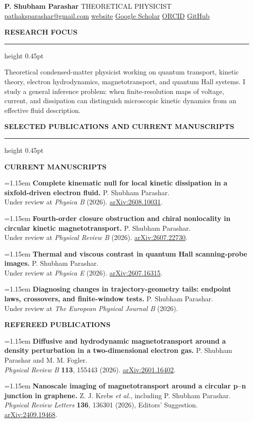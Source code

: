\documentclass[10.5pt,a4paper]{article}
\newcommand{\sans}[1]{{\sffamily #1}}
\newcommand{\cvsection}[1]{%
  \vspace{11.5pt}%
  {\sans{\fontsize{9.1}{10}\selectfont\bfseries\color{accent}\MakeUppercase{#1}}}\par
  \vspace{2.4pt}\color{rule}\hrule height 0.45pt\color{ink}\vspace{5.4pt}
}
\newcommand{\pub}[3]{%
  \noindent\hangindent=1.15em\hangafter=1
  {\bfseries #1} #2\\[-0.8pt]
  {\sans{\fontsize{9.3}{11}\selectfont\color{muted}#3}}\par\vspace{6.2pt}
}
\newcommand{\pubgroup}[1]{%
  \vspace{1.0pt}%
  {\sans{\fontsize{8.5}{9.6}\selectfont\bfseries\color{muted}\MakeUppercase{#1}}}\par
  \vspace{4.6pt}
}
\begin{document}
\raggedbottom

{\fontsize{26}{28}\selectfont\bfseries P. Shubham Parashar}\hfill
{\sans{\fontsize{9.6}{11}\selectfont\color{muted}THEORETICAL PHYSICIST}}\\[2.0pt]
{\sans{\fontsize{9.6}{11.5}\selectfont
\href{mailto:pathaksparashar@gmail.com}{pathaksparashar@gmail.com} \enspace\textperiodcentered\enspace
\href{https://shubham-parashar-cmt.github.io/}{website} \enspace\textperiodcentered\enspace
\href{https://scholar.google.com/citations?user=XXOQp8wAAAAJ\&hl=en}{Google Scholar} \enspace\textperiodcentered\enspace
\href{https://orcid.org/0009-0007-8741-9101}{ORCID} \enspace\textperiodcentered\enspace
\href{https://github.com/shubham-parashar-cmt}{GitHub}}}

\cvsection{Research focus}
\fontsize{10.6}{13.3}\selectfont
Theoretical condensed-matter physicist working on quantum transport, kinetic theory, electron hydrodynamics, magnetotransport, and quantum Hall systems. I study a general inference problem: when finite-resolution maps of voltage, current, and dissipation can distinguish microscopic kinetic dynamics from an effective fluid description.

\cvsection{Selected publications and current manuscripts}
\pubgroup{Current manuscripts}
\pub{Complete kinematic null for local kinetic dissipation in a sixfold-driven electron fluid.}{ P. Shubham Parashar.}{Under review at \textit{Physica B} (2026). \href{https://arxiv.org/abs/2608.10031}{arXiv:2608.10031}.}
\pub{Fourth-order closure obstruction and chiral nonlocality in circular kinetic magnetotransport.}{ P. Shubham Parashar.}{Under review at \textit{Physical Review B} (2026). \href{https://arxiv.org/abs/2607.22730}{arXiv:2607.22730}.}
\pub{Thermal and viscous contrast in quantum Hall scanning-probe images.}{ P. Shubham Parashar.}{Under review at \textit{Physica E} (2026). \href{https://arxiv.org/abs/2607.16315}{arXiv:2607.16315}.}
\pub{Diagnosing changes in trajectory-geometry tails: endpoint laws, crossovers, and finite-window tests.}{ P. Shubham Parashar.}{Under review at \textit{The European Physical Journal B} (2026).}
\vspace{2.2pt}
\pubgroup{Refereed publications}
\pub{Diffusive and hydrodynamic magnetotransport around a density perturbation in a two-dimensional electron gas.}{ P. Shubham Parashar and M. M. Fogler.}{\textit{Physical Review B} \textbf{113}, 155443 (2026). \href{https://arxiv.org/abs/2601.16402}{arXiv:2601.16402}.}
\pub{Nanoscale imaging of magnetotransport around a circular p--n junction in graphene.}{ Z. J. Krebs \textit{et al.}, including P. Shubham Parashar.}{\textit{Physical Review Letters} \textbf{136}, 136301 (2026), Editors' Suggestion. \href{https://arxiv.org/abs/2409.19468}{arXiv:2409.19468}.}
\end{document}
